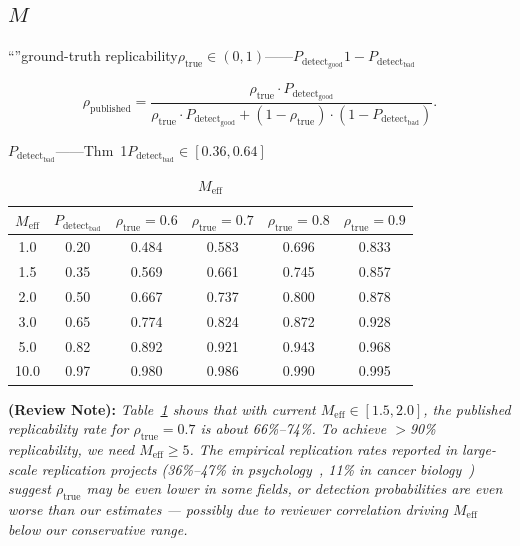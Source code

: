 \documentclass[12pt,a4paper]{article}
\theoremstyle{remark}
\newcommand{\detectProb}{P_{\text{detect}}}
\newcommand{\reviewnote}[1]{%
    \medskip\noindent
    \textbf{ (Review Note):} \textit{#1}%
}
\begin{document}
\subsection{$M$}

``''ground-truth replicability$\rho_{\text{true}} \in (0,1)$——$\detectProb_{\text{good}}$$1 - \detectProb_{\text{bad}}$

\textbf{}
\begin{equation}
    \rho_{\text{published}} = \frac{\rho_{\text{true}} \cdot \detectProb_{\text{good}}}{\rho_{\text{true}} \cdot \detectProb_{\text{good}} + (1 - \rho_{\text{true}}) \cdot (1 - \detectProb_{\text{bad}})}.
    \label{eq:published_replicability}
\end{equation}

$\detectProb_{\text{bad}}$——Thm~1$\detectProb_{\text{bad}} \in [0.36, 0.64]$

\begin{table}[H]
\centering
\caption{$M_{\text{eff}}$}
\label{tab:replicability}
\begin{tabular}{@{}cccccc@{}}
\toprule
$M_{\text{eff}}$ & $\detectProb_{\text{bad}}$ & $\rho_{\text{true}}=0.6$ & $\rho_{\text{true}}=0.7$ & $\rho_{\text{true}}=0.8$ & $\rho_{\text{true}}=0.9$ \\
\midrule
1.0 & 0.20 & 0.484 & 0.583 & 0.696 & 0.833 \\
1.5 & 0.35 & 0.569 & 0.661 & 0.745 & 0.857 \\
2.0 & 0.50 & 0.667 & 0.737 & 0.800 & 0.878 \\
3.0 & 0.65 & 0.774 & 0.824 & 0.872 & 0.928 \\
5.0 & 0.82 & 0.892 & 0.921 & 0.943 & 0.968 \\
10.0 & 0.97 & 0.980 & 0.986 & 0.990 & 0.995 \\
\bottomrule
\end{tabular}
\end{table}

\reviewnote{Table~\ref{tab:replicability} shows that with current $M_{\text{eff}} \in [1.5, 2.0]$, the published replicability rate for $\rho_{\text{true}}=0.7$ is about 66\%--74\%. To achieve $>$90\% replicability, we need $M_{\text{eff}} \geq 5$. The empirical replication rates reported in large-scale replication projects (36\%--47\% in psychology~\cite{open2015reproducibility}, 11\% in cancer biology~\cite{errington2021investigating}) suggest $\rho_{\text{true}}$ may be even lower in some fields, or detection probabilities are even worse than our estimates — possibly due to reviewer correlation driving $M_{\text{eff}}$ below our conservative range.}
\end{document}

